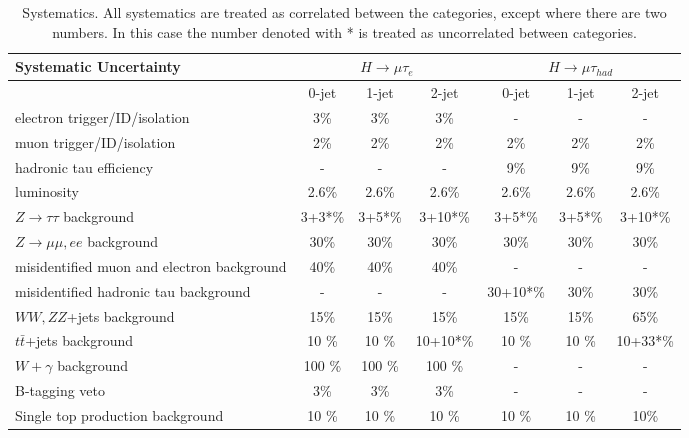\begin{table}[hbtp]
 \begin{center}
{\footnotesize
  \caption{Systematics. All systematics are treated as correlated between the categories, except where there are two numbers. In
this case the number denoted with * is treated as uncorrelated between categories.}
  \label{tab:systematics}
  \vspace{0.1in}
  \begin{tabular}{|l|c|c|c|c|c|c|} \hline
Systematic  Uncertainty                                &  \multicolumn{3}{c|}{$H \to \mu \tau_{e}$}& \multicolumn{3}{c|}{$H \to \mu \tau_{had}$}    \\ \hline
                                                       &  0-jet  & 1-jet  & 2-jet     &  0-jet    & 1-jet     & 2-jet     \\ \hline \hline
electron trigger/ID/isolation                          &   3\%   &   3\%  &   3\%     &    -      &   -       &  -        \\
muon  trigger/ID/isolation                             &   2\%   &   2\%  &   2\%     &    2\%    &  2\%      &  2\%      \\
hadronic tau efficiency                                &   -     &   -    &   -       &    9\%    &  9\%      &  9\%      \\
luminosity                                             &  2.6\%  &  2.6\% &  2.6\%    &  2.6\%    &  2.6\%    &  2.6\%    \\
$Z \to \tau \tau$ background                           &   3+3*\%&  3+5*\%&  3+10*\%  &   3+5*\%  &   3+5*\%  &   3+10*\% \\
$Z \to \mu\mu,ee$ background                           &   30\%  &  30\%  &  30\%     &   30\%    &   30\%    &   30\%    \\
misidentified muon and electron  background                      &  40\%   &  40\%  &  40\%     &    -      &   -       &   -       \\
misidentified hadronic tau  background                           &  -      &   -    &    -      &   30+10*\%&  30\%     &  30\%     \\
$WW,ZZ$+jets background                                &  15\%   &  15\%  &   15\%    &  15\%     &  15\%     &  65\%     \\
$t\bar{t}$+jets background                        &  10 \%  &  10 \% &  10+10*\% &  10 \%    &  10 \%    &  10+33*\% \\
$W +\gamma$ background                                 &  100 \% &  100 \%&  100 \%   &     -     &    -      &    -       \\
B-tagging veto                                         & 3\%     &   3\%  &   3\%     &    -      &    -      &    -       \\
Single top production background                       &  10 \%  &  10 \% &  10 \%    &  10 \%    &  10 \%    &   10\%    \\ \hline
  \end{tabular}
} %
 \end{center}
\end{table}
~               

